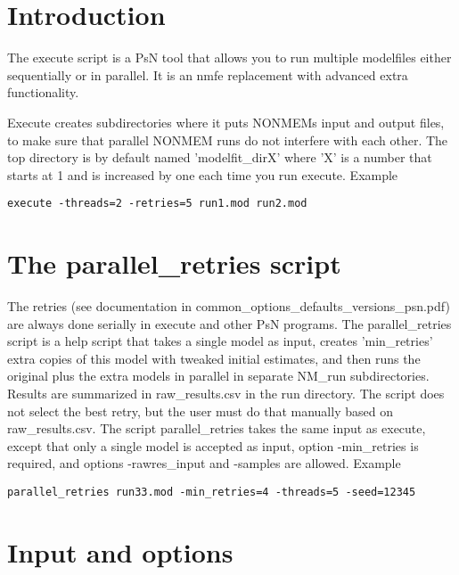 



\maketitle


\section{Introduction}
The execute script is a PsN tool that allows you to run multiple modelfiles either sequentially or in parallel. It is an nmfe replacement with advanced extra
functionality.

Execute creates subdirectories where it puts NONMEMs input and output files, to make sure that parallel NONMEM runs do not interfere with each other.
The top directory is by default named 'modelfit\_dirX' where 'X' is a number that starts at 1 and is increased by one each time you run execute.
Example
\begin{verbatim}
execute -threads=2 -retries=5 run1.mod run2.mod
\end{verbatim}

\section{The parallel\_retries script}
The retries (see documentation in common\_options\_defaults\_versions\_psn.pdf) are always done serially in execute and other PsN programs. The parallel\_retries script is a help script that takes a single model as input, creates 'min\_retries' extra copies of this model with tweaked initial estimates, and then runs the original plus the extra models in parallel in separate NM\_run subdirectories. Results are summarized in raw\_results.csv in the run directory. The script does not select the best retry, but the user must do that manually based on raw\_results.csv. The script parallel\_retries takes the same input as execute, except that only a single model is accepted as input, option -min\_retries is required, and options -rawres\_input and -samples are allowed. 
Example
\begin{verbatim}
parallel_retries run33.mod -min_retries=4 -threads=5 -seed=12345
\end{verbatim}

\section{Input and options}
